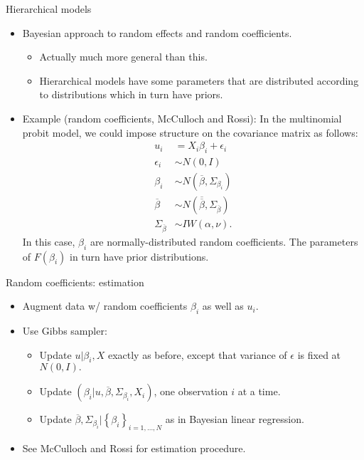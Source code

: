 \documentclass[aspectratio=169]{beamer}
\begin{document}
\begin{frame}{Hierarchical models}
\begin{itemize}
\item Bayesian approach to random effects and random coefficients.
\begin{itemize}
\item Actually much more general than this.
\item Hierarchical models have some parameters that are distributed according
to distributions which in turn have priors.
\end{itemize}
\item Example (random coefficients, McCulloch and Rossi): In the multinomial
probit model, we could impose structure on the covariance matrix as
follows: 
\begin{align*}
u_{i} & =X_{i}\beta_{i}+\epsilon_{i}\\
\epsilon_{i} & \sim N(0,I)\\
\beta_{i} & \sim N(\overline{\beta},\Sigma_{\beta_{i}})\\
\overline{\beta} & \sim N\left(\overline{\overline{\beta}},\Sigma_{\overline{\beta}}\right)\\
\Sigma_{\overline{\beta}} & \sim IW(\alpha,\nu).
\end{align*}
 In this case, $\beta_{i}$ are normally-distributed random coefficients.
The parameters of $F(\beta_{i})$ in turn have prior distributions.
\end{itemize}
\end{frame}
%
\begin{frame}{Random coefficients: estimation}
\begin{itemize}
\item Augment data w/ random coefficients $\beta_{i}$ as well as $u_{i}.$
\item Use Gibbs sampler:
\begin{itemize}
\item Update $u|\beta_{i},X$ exactly as before, except that variance of
$\epsilon$ is fixed at $N(0,I).$ 
\item Update $(\beta_{i}|u,\overline{\beta},\Sigma_{\beta_{i}},X_{i})$,
one observation $i$ at a time.
\item Update $\overline{\beta},\Sigma_{\beta_{i}}|\left\{ \beta_{i}\right\} _{i=1,\ldots,N}$
as in Bayesian linear regression. 
\end{itemize}
\item See McCulloch and Rossi for estimation procedure.
\end{itemize}
\end{frame}
\end{document}
